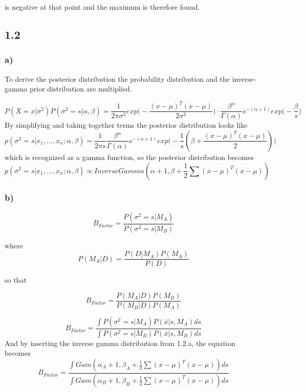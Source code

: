 \documentclass{article}
\begin{document}
is negative at that point and the maximum is therefore found.

\subsection*{1.2}

\subsubsection*{a)}
To derive the posterior distribution the probability distribution and the inverse-gamma prior distribution are multiplied. 

$$ P(X =x|\sigma^2) P(\sigma^2=s|\alpha , \beta) = \frac{1}{2\pi \sigma^2} exp\Big(-\frac{(x - \mu)^T(x-\mu)}{2\sigma^2}\Big)\cdot \frac{\beta^{\alpha}}{\Gamma(\alpha)}s^{-(\alpha+1)}exp\Big(-\frac{\beta}{s}\Big) $$
\noindent By simplifying and taking together terms the posterior distribution looks like
$$p(\sigma^2 = s|x_1,...,x_n;\alpha,\beta) = \frac{1}{2\pi s}\frac{\beta^{\alpha}}{\Gamma({\alpha})}s^{-(\alpha + 1)}exp\Big(-\frac{1}{s}(\beta+\frac{(x-\mu)^T(x-\mu)}{2})\Big) $$
\noindent which is recognized as a gamma function, so the posterior distribution becomes
\begin{equation}
p(\sigma^2=s|x_1,...,x_n;\alpha,\beta) \propto InverseGamma(\alpha+1, \beta + \frac{1}{2}\sum(x-\mu)^{T}(x-\mu))
\end{equation}

\subsubsection*{b)}

\begin{equation}
B_{Factor}=\frac{P(\sigma^2=s|M_A)}{P(\sigma^2=s|M_B)}
\end{equation}

where
\begin{equation}
P(M_A|D)=\frac{P(D|M_A)P(M_A)}{P(D)}
\end{equation}

so that

\begin{equation}
B_{Factor} = \frac{P(M_A|D)P(M_B) }{P(M_B|D)P(M_A)}
\end{equation}

\begin{equation}
	B_{Factor} = \frac{\int P(\sigma^2= s|M_A)P(\bar{x}|s,M_A) ds}{\int P(\sigma^2 = s|M_B)P(\bar{x}|s,M_B) ds}
\end{equation}
And by inserting the inverse gamma distribution from 1.2.a, the equation becomes
\begin{equation}
	B_{Factor} = \frac{\int Gam(\alpha_A+1,\beta_A+ \frac{1}{2}\sum(x-\mu)^T(x-\mu))ds}{\int Gam(\alpha_B+1,\beta_B+ \frac{1}{2}\sum(x-\mu)^T(x-\mu))ds}
\end{equation}
\end{document}
